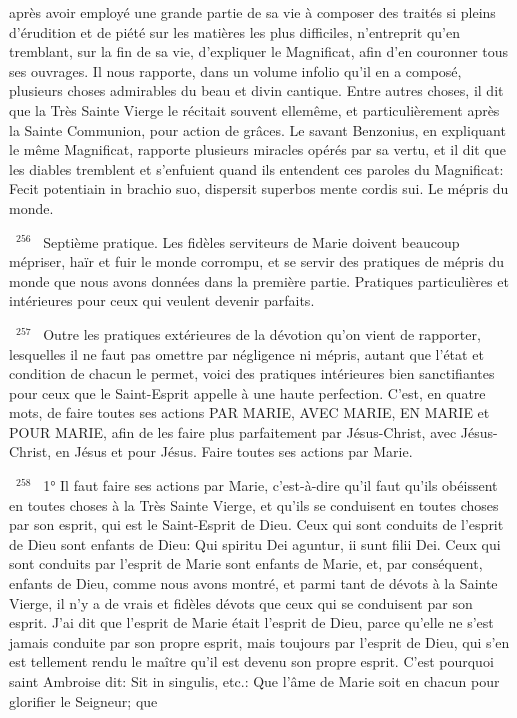 \documentclass[paper=a5,pagesize=pdftex,fontsize=15pt,headinclude=on,twoside=off]{scrbook}
\newcommand{\negphantom}[1]{\settowidth{\dimen0}{#1}\hspace*{-\dimen0}}
\newcommand{\versenb}[1]{\par \vspace{10pt}~\negphantom{~${}^{#1}$~}${}^{#1}$~}
\begin{document}
après avoir employé une grande partie de sa vie à composer des traités si pleins d'érudition et de piété sur les
matières les plus difficiles, n'entreprit qu'en tremblant, sur la fin de sa vie, d'expliquer le Magnificat, afin d'en
couronner tous ses ouvrages. Il nous rapporte, dans un volume infolio qu'il en a composé, plusieurs choses
admirables du beau et divin cantique. Entre autres choses, il dit que la Très Sainte Vierge le récitait souvent ellemême, et particulièrement après la Sainte Communion, pour action de grâces. Le savant Benzonius, en expliquant
le même Magnificat, rapporte plusieurs miracles opérés par sa vertu, et il dit que les diables tremblent et s'enfuient
quand ils entendent ces paroles du Magnificat: Fecit potentiain in brachio suo, dispersit superbos mente cordis sui.
Le mépris du monde.
\versenb{256} Septième pratique. Les fidèles serviteurs de Marie doivent beaucoup mépriser, haïr et fuir le monde
corrompu, et se servir des pratiques de mépris du monde que nous avons données dans la première partie.
Pratiques particulières et intérieures
pour ceux qui veulent devenir parfaits.
\versenb{257} Outre les pratiques extérieures de la dévotion qu'on vient de rapporter, lesquelles il ne faut pas omettre par
négligence ni mépris, autant que l'état et condition de chacun le permet, voici des pratiques intérieures bien
sanctifiantes pour ceux que le Saint-Esprit appelle à une haute perfection.
C'est, en quatre mots, de faire toutes ses actions PAR MARIE, AVEC MARIE, EN MARIE et POUR MARIE, afin de
les faire plus parfaitement par Jésus-Christ, avec Jésus-Christ, en Jésus et pour Jésus.
Faire toutes ses actions par Marie.
\versenb{258} 1° Il faut faire ses actions par Marie, c'est-à-dire qu'il faut qu'ils obéissent en toutes choses à la Très Sainte
Vierge, et qu'ils se conduisent en toutes choses par son esprit, qui est le Saint-Esprit de Dieu. Ceux qui sont
conduits de l'esprit de Dieu sont enfants de Dieu: Qui spiritu Dei aguntur, ii sunt filii Dei. Ceux qui sont conduits par
l'esprit de Marie sont enfants de Marie, et, par conséquent, enfants de Dieu, comme nous avons montré, et parmi
tant de dévots à la Sainte Vierge, il n'y a de vrais et fidèles dévots que ceux qui se conduisent par son esprit. J'ai
dit que l'esprit de Marie était l'esprit de Dieu, parce qu'elle ne s'est jamais conduite par son propre esprit, mais
toujours par l'esprit de Dieu, qui s'en est tellement rendu le maître qu'il est devenu son propre esprit. C'est
pourquoi saint Ambroise dit: Sit in singulis, etc.: Que l'âme de Marie soit en chacun pour glorifier le Seigneur; que
\end{document}
